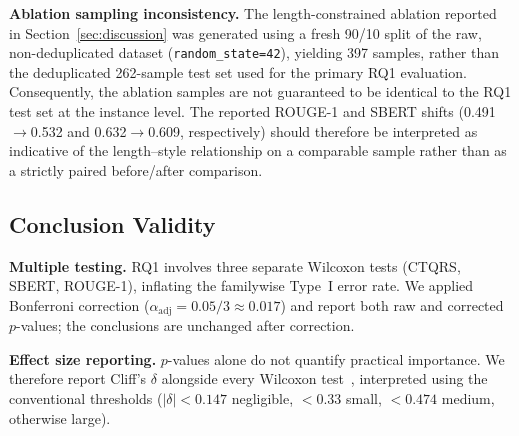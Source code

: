 \textbf{Ablation sampling inconsistency.}
The length-constrained ablation reported in
Section~\ref{sec:discussion} was generated using a fresh 90/10
split of the raw, non-deduplicated dataset
(\texttt{random\_state=42}), yielding 397 samples, rather than
the deduplicated 262-sample test set used for the primary RQ1
evaluation. Consequently, the ablation samples are not
guaranteed to be identical to the RQ1 test set at the instance
level. The reported ROUGE-1 and SBERT shifts
(0.491$\rightarrow$0.532 and 0.632$\rightarrow$0.609,
respectively) should therefore be interpreted as indicative of
the length--style relationship on a comparable sample rather
than as a strictly paired before/after comparison.

\subsection{Conclusion Validity}

\textbf{Multiple testing.}
RQ1 involves three separate Wilcoxon tests (CTQRS, SBERT,
ROUGE-1), inflating the familywise Type~I error rate.
We applied Bonferroni correction ($\alpha_{\text{adj}} =
0.05/3 \approx 0.017$) and report both raw and
corrected $p$-values; the conclusions are unchanged
after correction.

\textbf{Effect size reporting.}
$p$-values alone do not quantify practical importance.
We therefore report Cliff's $\delta$ alongside every
Wilcoxon test~\cite{arcuri2011practical}, interpreted
using the conventional thresholds ($|\delta|<0.147$
negligible, $<0.33$ small, $<0.474$ medium, otherwise
large).